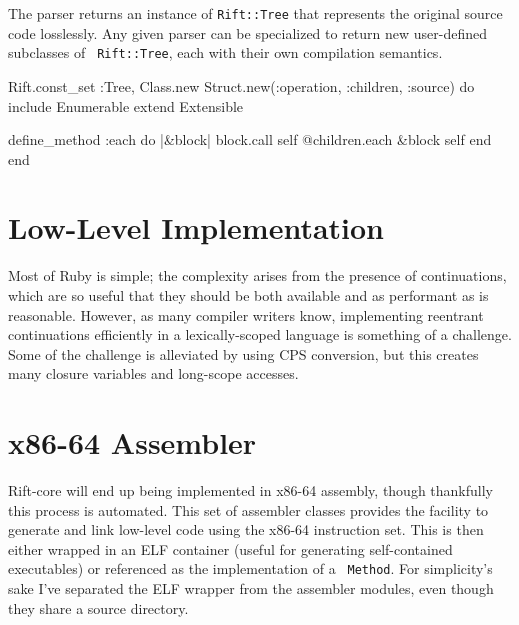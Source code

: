 \documentclass{report}
\begin{document}
    The parser returns an instance of {\tt Rift::Tree} that represents the original source code losslessly. Any given parser can be specialized to return new user-defined subclasses of {\tt
    Rift::Tree}, each with their own compilation semantics.

\begin{rubycode}
Rift.const_set :Tree, Class.new Struct.new(:operation, :children, :source) do
  include Enumerable
  extend  Extensible

  define_method :each do |&block|
    block.call self
    @children.each &block
    self
  end
end \end{rubycode}

\chapter{Low-Level Implementation}
  Most of Ruby is simple; the complexity arises from the presence of continuations, which are so useful that they should be both available and as performant as is reasonable. However, as many
  compiler writers know, implementing reentrant continuations efficiently in a lexically-scoped language is something of a challenge. Some of the challenge is alleviated by using CPS
  conversion, but this creates many closure variables and long-scope accesses.

\chapter{x86-64 Assembler}
  Rift-core will end up being implemented in x86-64 assembly, though thankfully this process is automated. This set of assembler classes provides the facility to generate and link low-level
  code using the x86-64 instruction set. This is then either wrapped in an ELF container (useful for generating self-contained executables) or referenced as the implementation of a {\tt
  Method}. For simplicity's sake I've separated the ELF wrapper from the assembler modules, even though they share a source directory.
\end{document}

